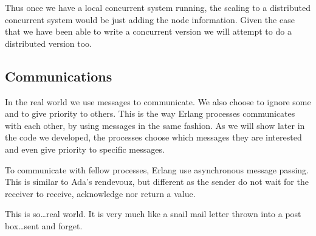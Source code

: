 \documentclass[a4paper,11pt]{report}
\begin{document}
Thus once we have a local concurrent system running, the scaling to a
distributed concurrent system would be just adding the node
information. Given the ease that we have been able to write a
concurrent version we will attempt to do a distributed version too.

\subsection{Communications}
\label{sec:communications}

In the real world we use messages to communicate. We also choose to
ignore some and to give priority to others. This is the way Erlang
processes communicates with each other, by using messages in the same
fashion. As we will show later in the code we developed, the processes
choose which messages they are interested and even give priority to
specific messages.

To communicate with fellow processes, Erlang use asynchronous message
passing. This is similar to Ada's rendevouz, but different as the
sender do not wait for the receiver to receive, acknowledge nor return
a value.

 This is so\ldots real world. It is very much like a
snail mail letter thrown into a post box\ldots sent and forget.
\end{document}
